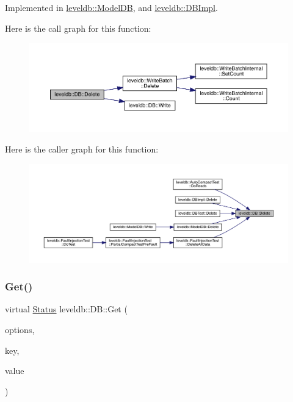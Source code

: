 Implemented in \mbox{\hyperlink{classleveldb_1_1_model_d_b_a2c2690e07a206fd2197f592dd4478ff6}{leveldb\+::\+Model\+DB}}, and \mbox{\hyperlink{classleveldb_1_1_d_b_impl_af050f77e8c22bd6638fed5a46a59399d}{leveldb\+::\+D\+B\+Impl}}.

Here is the call graph for this function\+:
\nopagebreak
\begin{figure}[H]
\begin{center}
\leavevmode
\includegraphics[width=350pt]{classleveldb_1_1_d_b_aff7577239799cd059464701c548090b9_cgraph}
\end{center}
\end{figure}
Here is the caller graph for this function\+:
\nopagebreak
\begin{figure}[H]
\begin{center}
\leavevmode
\includegraphics[width=350pt]{classleveldb_1_1_d_b_aff7577239799cd059464701c548090b9_icgraph}
\end{center}
\end{figure}
\mbox{\label{classleveldb_1_1_d_b_ad43bd7937b9af88ff856eb8158890911}} 
\subsubsection{\texorpdfstring{Get()}{Get()}}
{\footnotesize\ttfamily virtual \mbox{\hyperlink{classleveldb_1_1_status}{Status}} leveldb\+::\+D\+B\+::\+Get (\begin{DoxyParamCaption}\item[{const \mbox{\hyperlink{structleveldb_1_1_read_options}{Read\+Options}} \&}]{options,  }\item[{const \mbox{\hyperlink{classleveldb_1_1_slice}{Slice}} \&}]{key,  }\item[{std\+::string $\ast$}]{value }\end{DoxyParamCaption})\hspace{0.3cm}{\ttfamily [pure virtual]}}



